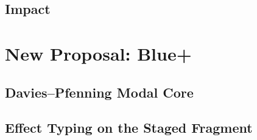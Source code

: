 \documentclass[11pt]{report}
\theoremstyle{definition}
\begin{document}
\begin{mainf}

\section{Impact}
\label{sec:analysis-impact}



%
%

\chapter{New Proposal: Blue+}
\label{ch:proposal}


\section{Davies--Pfenning Modal Core}
\label{sec:proposal-modal-core}


\section{Effect Typing on the Staged Fragment}
\label{sec:proposal-effects}


\end{mainf}
\end{document}
